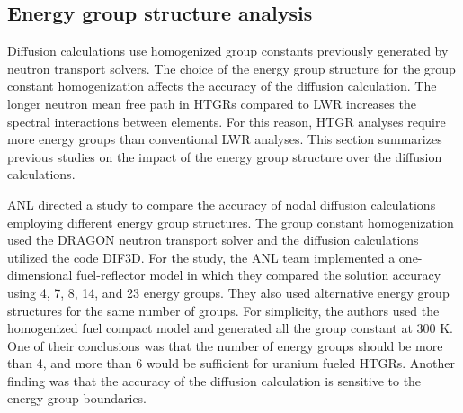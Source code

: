\subsection{Energy group structure analysis}
\label{sec:energy-struct}

Diffusion calculations use homogenized group constants previously generated by neutron transport solvers.
The choice of the energy group structure for the group constant homogenization affects the accuracy of the diffusion calculation.
The longer neutron mean free path in \glspl{HTGR} compared to \gls{LWR} increases the spectral interactions between elements.
For this reason, HTGR analyses require more energy groups than conventional \gls{LWR} analyses.
This section summarizes previous studies on the impact of the energy group structure over the diffusion calculations.

\gls{ANL} directed a study \cite{lee_status_2006} to compare the accuracy of nodal diffusion calculations employing different energy group structures.
The group constant homogenization used the DRAGON neutron transport solver and the diffusion calculations utilized the code DIF3D.
For the study, the ANL team implemented a one-dimensional fuel-reflector model in which they compared the solution accuracy using 4, 7, 8, 14, and 23 energy groups.
They also used alternative energy group structures for the same number of groups.
For simplicity, the authors used the homogenized fuel compact model and generated all the group constant at 300 K.
One of their conclusions was that the number of energy groups should be more than 4, and more than 6 would be sufficient for uranium fueled HTGRs.
Another finding was that the accuracy of the diffusion calculation is sensitive to the energy group boundaries.


